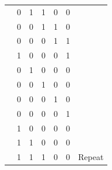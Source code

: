 \documentclass[a4paper, 11pt]{article}
\begin{document}
\begin{table}[htbp]
\begin{tabular}{rcccccl}
  \cline{2-6}          & 0     & 1     & 1     & 0     & 0     &  \bigstrut\\
  \cline{2-6}          & 0     & 0     & 1     & 1     & 0     &  \bigstrut\\
  \cline{2-6}          & 0     & 0     & 0     & 1     & 1     &  \bigstrut\\
  \cline{2-6}          & 1     & 0     & 0     & 0     & 1     &  \bigstrut\\
  \cline{2-6}          & 0     & 1     & 0     & 0     & 0     &  \bigstrut\\
  \cline{2-6}          & 0     & 0     & 1     & 0     & 0     &  \bigstrut\\
  \cline{2-6}          & 0     & 0     & 0     & 1     & 0     &  \bigstrut\\
  \cline{2-6}          & 0     & 0     & 0     & 0     & 1     &  \bigstrut\\
  \cline{2-6}          & 1     & 0     & 0     & 0     & 0     &  \bigstrut\\
  \cline{2-6}          & 1     & 1     & 0     & 0     & 0     &  \bigstrut\\
  \cline{2-7}          & 1     & 1     & 1     & 0     & 0     & Repeat \bigstrut\\
  \cline{2-7}    \end{tabular}%
    \label{tab:addlabel}%
  \end{table}%
\end{document}
